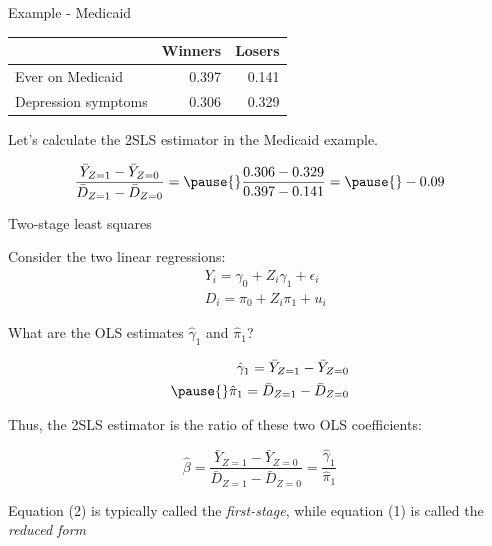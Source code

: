 \documentclass[11pt,english,handout]{beamer}
\newenvironment{wideitemize}{\itemize\addtolength{\itemsep}{10pt}}{\enditemize}
\begin{document}
\begin{frame}{Example - Medicaid}
			\begin{tabular}{lrr}
	& Winners & Losers \\ \hline
	Ever on Medicaid & 0.397 & 0.141 \\
	Depression symptoms & 0.306 &  0.329 
\end{tabular}

\bigskip 
\begin{wideitemize}
	\item
	Let's calculate the 2SLS estimator in the Medicaid example.
	
	\pause
	$$ \dfrac{  \bar{Y}_{Z=1} - \bar{Y}_{Z=0}   }{ \bar{D}_{Z=1} - \bar{D}_{Z=0} }  = \pause{} \frac{0.306 - 0.329}{0.397 - 0.141}  = \pause{} -0.09$$
	
\end{wideitemize}


\end{frame}



\begin{frame}{Two-stage least squares}

\begin{wideitemize}
	\item
	Consider the two linear regressions:
	\begin{align}
		&Y_{i} = \gamma_0 +   Z_i \gamma_1 + \epsilon_{i} \\
		&D_i = \pi_0 + Z_i \pi_1 + u_i
	\end{align}

	\item
	What are the OLS estimates $\hat\gamma_1$ and $\hat\pi_1$? 
	
	\pause
	\begin{align*}
		\hat\gamma_1 = \bar{Y}_{Z=1} - \bar{Y}_{Z=0} \\ \pause{}
		\hat\pi_1 = \bar{D}_{Z=1} - \bar{D}_{Z=0}
	\end{align*}

	
	\pause
	\item
	Thus, the 2SLS estimator is the ratio of these two OLS coefficients:
	
	$$\hat\beta =  \dfrac{  \bar{Y}_{Z=1} - \bar{Y}_{Z=0}   }{ \bar{D}_{Z=1} - \bar{D}_{Z=0} } = \frac{\hat\gamma_1}{\hat\pi_1} $$
	
	
	\pause
	\item
	Equation (2) is typically called the \textit{first-stage}, while equation (1) is called the \textit{reduced form}
\end{wideitemize}	
	
\end{frame}
\end{document}
